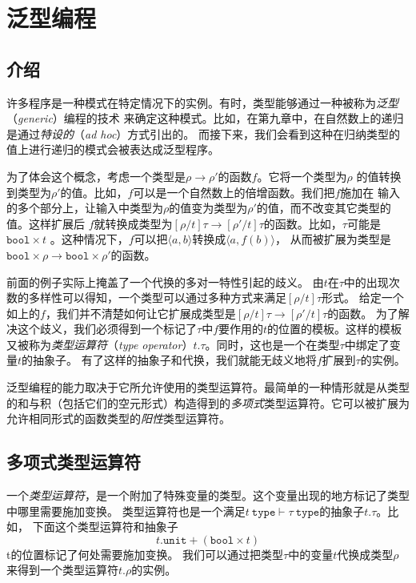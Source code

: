 \chapter{泛型编程}

\section{介绍}

许多程序是一种模式在特定情况下的实例。有时，类型能够通过一种被称为\textit{泛型}（\textit{generic}）编程的技术
来确定这种模式。比如，在第九章中，在自然数上的递归是通过\textit{特设的}（\textit{ad hoc}）方式引出的。
而接下来，我们会看到这种在归纳类型的值上进行递归的模式会被表达成泛型程序。

为了体会这个概念，考虑一个类型是$\rho \rightarrow \rho'$的函数$f$。它将一个类型为$\rho$
的值转换到类型为$\rho'$的值。比如，$f$可以是一个自然数上的倍增函数。我们把$f$施加在
输入的多个部分上，让输入中类型为$\rho$的值变为类型为$\rho'$的值，而不改变其它类型的值。这样扩展后
$f$就转换成类型为$[\rho/t]\tau \rightarrow [\rho'/t]\tau$的函数。比如，$\tau$可能是$\texttt{bool} \times t$
。这种情况下，$f$可以把$\langle a,b\rangle$转换成$\langle a, f(b)\rangle$，
从而被扩展为类型是$\texttt{bool}\times\rho\rightarrow\texttt{bool}\times\rho'$的函数。

前面的例子实际上掩盖了一个代换的多对一特性引起的歧义。
由$t$在$\tau$中的出现次数的多样性可以得知，一个类型可以通过多种方式来满足$[\rho/t]\tau$形式。
给定一个如上的$f$，我们并不清楚如何让它扩展成类型是$[\rho/t]\tau \rightarrow [\rho'/t]\tau$的函数。
为了解决这个歧义，我们必须得到一个标记了$\tau$中$f$要作用的$t$的位置的模板。这样的模板又被称为\textit{类型运算符}（\textit{type operator}）$t.\tau$。同时，这也是一个在类型$\tau$中绑定了变量$t$的抽象子。
有了这样的抽象子和代换，我们就能无歧义地将$f$扩展到$\tau$的实例。

泛型编程的能力取决于它所允许使用的类型运算符。最简单的一种情形就是从类型的和与积（包括它们的空元形式）构造得到的\textit{多项式}类型运算符。它可以被扩展为允许相同形式的函数类型的\textit{阳性}类型运算符。

\section{多项式类型运算符}

一个\textit{类型运算符}，是一个附加了特殊变量的类型。这个变量出现的地方标记了类型中哪里需要施加变换。
类型运算符也是一个满足$t\ \texttt{type} \vdash \tau\ \texttt{type}$的抽象子$t.\tau$。比如，
下面这个类型运算符和抽象子$$t.\texttt{unit}+(\texttt{bool}\times t)$$t的位置标记了何处需要施加变换。
我们可以通过把类型$\tau$中的变量$t$代换成类型$\rho$来得到一个类型运算符$t.\rho$的实例。

